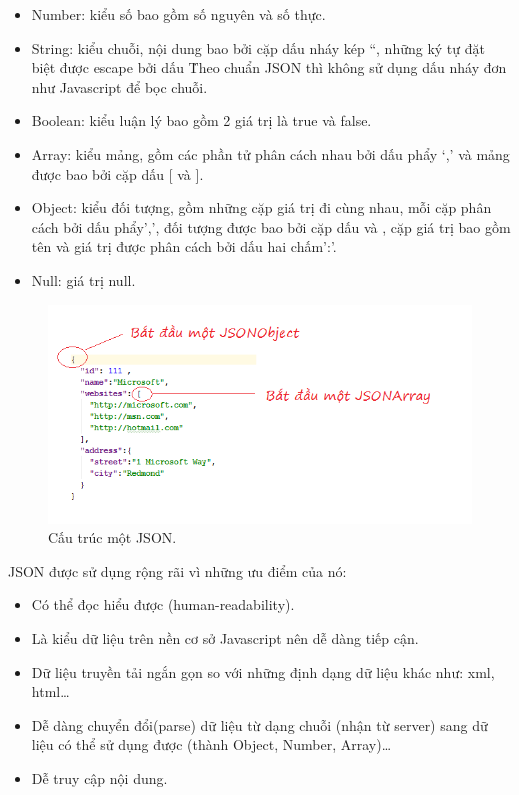 \documentclass[a4paper,12pt,oneside]{article}
\begin{document}
\begin{itemize}
\item Number: kiểu số bao gồm số nguyên và số thực.
\item String: kiểu chuỗi, nội dung bao bởi cặp dấu nháy kép “, những ký tự đặt biệt được escape bởi dấu \.Theo chuẩn JSON thì không sử dụng dấu nháy đơn như Javascript để bọc chuỗi.
\item Boolean: kiểu luận lý bao gồm 2 giá trị là true và false.
\item Array: kiểu mảng, gồm các phần tử phân cách nhau bởi dấu phẩy ‘,’ và mảng được bao bởi cặp dấu [ và ].
\item Object: kiểu đối tượng, gồm những cặp giá trị đi cùng nhau, mỗi cặp phân cách bởi dấu phẩy’,’, đối tượng được bao bởi cặp dấu { và }, cặp giá trị bao gồm tên và giá trị được phân cách bởi dấu hai chấm’:’.
\item Null: giá trị null.
\end{itemize}

\begin{center}
\begin{figure}[h]
\begin{center}
\includegraphics[scale=.8]{hinh/json.png}
\end{center}
\caption{Cấu trúc một JSON.}

\end{figure}
\end{center}

JSON được sử dụng rộng rãi vì những ưu điểm của nó:
\begin{itemize}
\item Có thể đọc hiểu được (human-readability).
\item Là kiểu dữ liệu trên nền cơ sở Javascript nên dễ dàng tiếp cận.
\item Dữ liệu truyền tải ngắn gọn so với những định dạng dữ liệu khác như: xml, html…
\item Dễ dàng chuyển đổi(parse) dữ liệu từ dạng chuỗi (nhận từ server) sang dữ liệu có thể sử dụng được (thành Object, Number, Array)…
\item Dễ truy cập nội dung.
\end{itemize}
\end{document}
